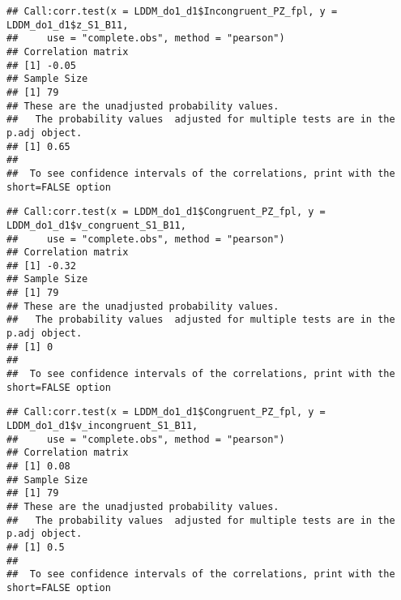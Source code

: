 \documentclass[
]{article}
\newenvironment{Shaded}{\begin{snugshade}}{\end{snugshade}}
\newcommand{\AttributeTok}[1]{\textcolor[rgb]{0.77,0.63,0.00}{#1}}
\newcommand{\FunctionTok}[1]{\textcolor[rgb]{0.00,0.00,0.00}{#1}}
\newcommand{\NormalTok}[1]{#1}
\newcommand{\SpecialCharTok}[1]{\textcolor[rgb]{0.00,0.00,0.00}{#1}}
\newcommand{\StringTok}[1]{\textcolor[rgb]{0.31,0.60,0.02}{#1}}
\begin{document}
\begin{verbatim}
## Call:corr.test(x = LDDM_do1_d1$Incongruent_PZ_fpl, y = LDDM_do1_d1$z_S1_B11, 
##     use = "complete.obs", method = "pearson")
## Correlation matrix 
## [1] -0.05
## Sample Size 
## [1] 79
## These are the unadjusted probability values.
##   The probability values  adjusted for multiple tests are in the p.adj object. 
## [1] 0.65
## 
##  To see confidence intervals of the correlations, print with the short=FALSE option
\end{verbatim}

\begin{Shaded}
\end{Shaded}

\begin{verbatim}
## Call:corr.test(x = LDDM_do1_d1$Congruent_PZ_fpl, y = LDDM_do1_d1$v_congruent_S1_B11, 
##     use = "complete.obs", method = "pearson")
## Correlation matrix 
## [1] -0.32
## Sample Size 
## [1] 79
## These are the unadjusted probability values.
##   The probability values  adjusted for multiple tests are in the p.adj object. 
## [1] 0
## 
##  To see confidence intervals of the correlations, print with the short=FALSE option
\end{verbatim}

\begin{Shaded}
\end{Shaded}

\begin{verbatim}
## Call:corr.test(x = LDDM_do1_d1$Congruent_PZ_fpl, y = LDDM_do1_d1$v_incongruent_S1_B11, 
##     use = "complete.obs", method = "pearson")
## Correlation matrix 
## [1] 0.08
## Sample Size 
## [1] 79
## These are the unadjusted probability values.
##   The probability values  adjusted for multiple tests are in the p.adj object. 
## [1] 0.5
## 
##  To see confidence intervals of the correlations, print with the short=FALSE option
\end{verbatim}
\end{document}
